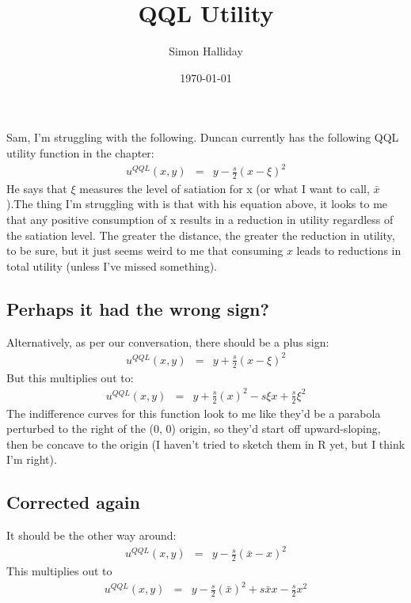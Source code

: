 \documentclass{tufte-handout}
\title{QQL Utility}
\author{Simon Halliday}
\date{\today}
\begin{document}
\maketitle 


Sam, 
I'm struggling with the following. Duncan currently has the following QQL utility function in the chapter: 
\begin{eqnarray}
u^{QQL}(x,y) & = & y - \frac{s}{2}(x - \xi)^2 \label{eq:qqlduncan}
\end{eqnarray}
He says that $\xi$ measures the level of satiation for x (or what I want to call, $\bar{x}$).The thing I'm struggling with is that with his equation above, it looks to me that any positive consumption of x results in a reduction in utility regardless of the satiation level.  The greater the distance, the greater the reduction in utility, to be sure, but it just seems weird to me that consuming $x$ leads to reductions in total utility (unless I've missed something). 

\subsection{Perhaps it had the wrong sign?}
Alternatively, as per our conversation, there should be a plus sign: 
\begin{eqnarray}
u^{QQL}(x,y) & = & y + \frac{s}{2}(x - \xi)^2 \label{eq:qqld2}
\end{eqnarray}
But this multiplies out to: 
\begin{eqnarray}
u^{QQL}(x,y) & = & y + \frac{s}{2}(x)^2  - s \xi x + \frac{s}{2}\xi^2 \label{eq:qqld3}
\end{eqnarray}
The indifference curves for this function look to me like they'd be a parabola perturbed to the right of the (0, 0) origin, so they'd start off upward-sloping, then be concave to the origin (I haven't tried to sketch them in R yet, but I think I'm right). 

\subsection{Corrected again}
It should be the other way around: 
\begin{eqnarray}
u^{QQL}(x,y) & = & y - \frac{s}{2}(\bar{x} - x)^2 \label{eq:qqld4}
\end{eqnarray}
This multiplies out to
\begin{eqnarray}
u^{QQL}(x,y) & = & y - \frac{s}{2}(\bar{x})^2  + s \bar{x} x - \frac{s}{2}x^2 \label{eq:qqld5}
\end{eqnarray}
\end{document}
